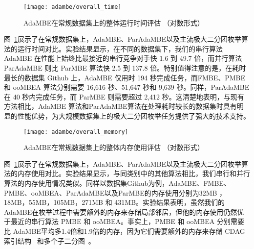 


\begin{figure} [H]
	\centering
	\texttt{[image: adambe/overall\_time]}
	\caption{AdaMBE在常规数据集上的整体运行时间评估 （对数形式）}

	\label{fig:ada_overall_time}
\end{figure}




图~\ref{fig:ada_overall_time}展示了在常规数据集上，AdaMBE、ParAdaMBE以及主流极大二分团枚举算法的运行时间对比。实验结果显示，在不同的数据集下，我们的串行算法 AdaMBE 在性能上始终比最接近的串行竞争对手快 1.6 到 49.7 倍，而并行算法 ParAdaMBE 则比 ParMBE 算法快 2.5 到 137.8 倍。特别值得注意的是，在耗时最长的数据集 Github 上，AdaMBE 仅用时 194 秒完成任务，而FMBE、PMBE 和 ooMBEA 算法分别需要 16,616 秒、51,647 秒和 9,639 秒。同样，ParAdaMBE 在 40 秒内完成任务，而 ParMBE 则需要超过 2,412 秒。这清楚地表明，与现有方法相比，AdaMBE 算法和ParAdaMBE算法在处理耗时较长的数据集时具有明显的性能优势，为大规模数据集上的极大二分团枚举任务提供了强大的技术支持。

\begin{figure} [t]
	\centering
	\texttt{[image: adambe/overall\_memory]}
	\caption{AdaMBE在常规数据集上的整体内存使用评估 （对数形式）}

	\label{fig:ada_overall_memory}
\end{figure}

图~\ref{fig:ada_overall_time}展示了在常规数据集上，AdaMBE、ParAdaMBE以及主流极大二分团枚举算法的内存使用对比。实验结果显示，与同类别中的其他算法相比，我们串行和并行算法的内存使用情况类似。同样以数据集Github为例，AdaMBE、FMBE、PMBE、ooMBEA、ParAdaMBE以及ParMBE的内存使用分别为32MB ，18MB，55MB，105MB，271MB 和	431MB。实验结果表明，虽然我们的AdaMBE在枚举过程中需要额外的内存来存储局部邻居，但他的内存使用仍然优于最近的串行算法 PMBE 和 ooMBEA。事实上，PMBE 和 ooMBEA 分别需要比 AdaMBE平均多1.4倍和1.9倍的内存，因为它们需要额外的内存来存储 CDAG 索引结构~\cite{PMBE20} 和多个子二分图~\cite{ooMBE22}。

